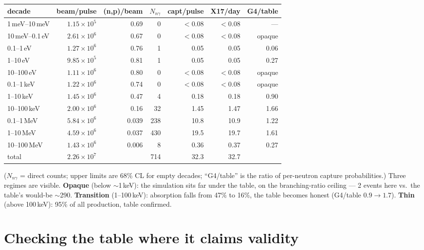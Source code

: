 \documentclass[11pt,a4paper]{article}
\begin{document}
\begin{center}
\small
\begin{tabular}{lrrrrrr}
\hline
decade & beam/pulse & (n,p)/beam & $N_{n\gamma}$ & capt/pulse & X17/day & G4/table \\
\hline
1\,meV--10\,meV & $1.15\times10^{5}$ & 0.69 & 0 & $<0.08$ & $<0.08$ & --- \\
10\,meV--0.1\,eV & $2.61\times10^{6}$ & 0.67 & 0 & $<0.08$ & $<0.08$ & opaque \\
0.1--1\,eV    & $1.27\times10^{6}$ & 0.76 & 1 & 0.05 & 0.05 & 0.06 \\
1--10\,eV     & $9.85\times10^{5}$ & 0.81 & 1 & 0.05 & 0.05 & 0.27 \\
10--100\,eV   & $1.11\times10^{6}$ & 0.80 & 0 & $<0.08$ & $<0.08$ & opaque \\
0.1--1\,keV   & $1.22\times10^{6}$ & 0.74 & 0 & $<0.08$ & $<0.08$ & opaque \\
1--10\,keV    & $1.45\times10^{6}$ & 0.47 & 4 & 0.18 & 0.18 & 0.90 \\
10--100\,keV  & $2.00\times10^{6}$ & 0.16 & 32 & 1.45 & 1.47 & 1.66 \\
0.1--1\,MeV   & $5.84\times10^{6}$ & 0.039 & 238 & 10.8 & 10.9 & 1.22 \\
1--10\,MeV    & $4.59\times10^{6}$ & 0.037 & 430 & 19.5 & 19.7 & 1.61 \\
10--100\,MeV  & $1.43\times10^{6}$ & 0.006 & 8 & 0.36 & 0.37 & 0.27 \\
\hline
total         & $2.26\times10^{7}$ &  & 714 & 32.3 & 32.7 & \\
\hline
\end{tabular}
\end{center}

\noindent ($N_{n\gamma}$ = direct counts; upper limits are 68\% CL for empty
decades; ``G4/table'' is the ratio of per-neutron capture probabilities.)
Three regimes are visible. \textbf{Opaque} (below $\sim$1\,keV): the
simulation sits far under the table, on the branching-ratio ceiling ---
2 events here vs.\ the table's would-be $\sim$290. \textbf{Transition}
(1--100\,keV): absorption falls from 47\% to 16\%, the table becomes honest
(G4/table $0.9\to1.7$). \textbf{Thin} (above 100\,keV): 95\% of all
production, table confirmed.

\section{Checking the table where it claims validity}
\end{document}
